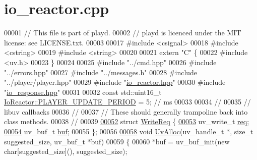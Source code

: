 \hypertarget{io__reactor_8cpp_source}{\section{io\+\_\+reactor.\+cpp}
\label{io__reactor_8cpp_source}
}

\begin{DoxyCode}
00001 \textcolor{comment}{// This file is part of playd.}
00002 \textcolor{comment}{// playd is licenced under the MIT license: see LICENSE.txt.}
00003 
00017 \textcolor{preprocessor}{#include <csignal>}
00018 \textcolor{preprocessor}{#include <cstring>}
00019 \textcolor{preprocessor}{#include <string>}
00020 
00021 \textcolor{keyword}{extern} \textcolor{stringliteral}{"C"} \{
00022 \textcolor{preprocessor}{#include <uv.h>}
00023 \}
00024 
00025 \textcolor{preprocessor}{#include "../cmd.hpp"}
00026 \textcolor{preprocessor}{#include "../errors.hpp"}
00027 \textcolor{preprocessor}{#include "../messages.h"}
00028 \textcolor{preprocessor}{#include "../player/player.hpp"}
00029 \textcolor{preprocessor}{#include "\hyperlink{io__reactor_8hpp}{io\_reactor.hpp}"}
00030 \textcolor{preprocessor}{#include "\hyperlink{io__response_8hpp}{io\_response.hpp}"}
00031 
00032 \textcolor{keyword}{const} std::uint16\_t \hyperlink{classIoReactor_a1d8cc56deaa2e801347c21e6490d4f5c}{IoReactor::PLAYER\_UPDATE\_PERIOD} = 5; \textcolor{comment}{// ms}
00033 
00034 \textcolor{comment}{//}
00035 \textcolor{comment}{// libuv callbacks}
00036 \textcolor{comment}{//}
00037 \textcolor{comment}{// These should generally trampoline back into class methods.}
00038 \textcolor{comment}{//}
00039 
\hypertarget{io__reactor_8cpp_source_l00052}{}\hyperlink{structWriteReq}{00052} \textcolor{keyword}{struct }\hyperlink{structWriteReq}{WriteReq} \{
\hypertarget{io__reactor_8cpp_source_l00053}{}\hyperlink{structWriteReq_a1ce5132e8813190d079864301a54090e}{00053}     uv\_write\_t \hyperlink{structWriteReq_a1ce5132e8813190d079864301a54090e}{req}; 
\hypertarget{io__reactor_8cpp_source_l00054}{}\hyperlink{structWriteReq_a2e611e010ab154c56c8055dee140b6b5}{00054}     uv\_buf\_t \hyperlink{structWriteReq_a2e611e010ab154c56c8055dee140b6b5}{buf};   
00055 \};
00056 
\hypertarget{io__reactor_8cpp_source_l00058}{}\hyperlink{io__reactor_8cpp_ab0c51a1d8447db72e81a13d45448b85f}{00058} \textcolor{keywordtype}{void} \hyperlink{io__reactor_8cpp_ab0c51a1d8447db72e81a13d45448b85f}{UvAlloc}(uv\_handle\_t *, \textcolor{keywordtype}{size\_t} suggested\_size, uv\_buf\_t *buf)
00059 \{
00060     *buf = uv\_buf\_init(\textcolor{keyword}{new} \textcolor{keywordtype}{char}[suggested\_size](), suggested\_size);

\end{DoxyCode}
